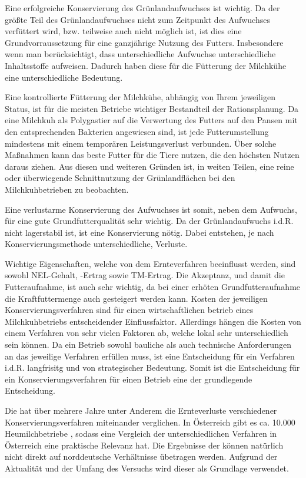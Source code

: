 Eine erfolgreiche Konservierung des Grünlandaufwuchses ist wichtig.
Da der größte Teil des Grünlandaufwuchses nicht zum Zeitpunkt des Aufwuchses verfüttert wird, bzw. teilweise auch nicht möglich ist, ist dies eine Grundvorraussetzung für eine ganzjährige Nutzung des Futters.
Insbesondere wenn man berücksichtigt, dass unterschiedliche Aufwuchse unterschiedliche Inhaltsstoffe aufweisen.
Dadurch haben diese für die Fütterung der Milchkühe eine unterschiedliche Bedeutung.

Eine kontrollierte Fütterung der Milchkühe, abhängig von Ihrem jeweiligen Status, ist für die meisten Betriebe wichtiger Bestandteil der Rationsplanung.
Da eine Milchkuh als Polygastier auf die Verwertung des Futters auf den Pansen mit den entsprechenden Bakterien angewiesen sind, ist jede Futterumstellung mindestens mit einem temporären Leistungsverlust verbunden.
Über solche Maßnahmen kann das beste Futter für die Tiere nutzen, die den höchsten Nutzen daraus ziehen.
Aus diesen und weiteren Gründen ist, in weiten Teilen, eine reine oder überwiegende Schnittnutzung der Grünlandflächen bei den Milchkuhbetrieben zu beobachten.

Eine verlustarme Konservierung des Aufwuchses ist somit, neben dem Aufwuchs, für eine gute Grundfutterqualität sehr wichtig.
Da der Grünlandaufwuchs i.d.R. nicht lagerstabil ist, ist eine Konservierung nötig.
Dabei entstehen, je nach Konservierungsmethode unterschiedliche, Verluste.

Wichtige Eigenschaften, welche von dem Ernteverfahren beeinflusst werden, sind sowohl \ac{NEL}-Gehalt, -Ertrag sowie \ac{TM}-Ertrag.
Die Akzeptanz, und damit die Futteraufnahme, ist auch sehr wichtig, da bei einer erhöten Grundfutteraufnahme die Kraftfuttermenge auch gesteigert werden kann.
Kosten der jeweiligen Konservierungsverfahren sind für einen wirtschaftlichen betrieb eines Milchkuhbetriebs entscheidender Einflussfaktor.
Allerdings hängen die Kosten von einem Verfahren von sehr vielen Faktoren ab, welche lokal sehr unterschiedlich sein können.
Da ein Betrieb sowohl bauliche als auch technische Anforderungen an das jeweilige Verfahren erfüllen muss, ist eine Entscheidung für ein Verfahren i.d.R. langfrisitg und von strategischer Bedeutung.
Somit ist die Entscheidung für ein Konservierungsverfahren für einen Betrieb eine der grundlegende Entscheidung.

Die \HBLFA hat über mehrere Jahre unter Anderem die Ernteverluste verschiedener Konservierungsverfahren miteinander verglichen.
In Österreich gibt es ca. 10.000 Heumilchbetriebe \parencite[75]{fritz2018ansatz}, sodass eine Vergleich der unterschiedlichen Verfahren in Österreich eine praktische Relevanz hat.
Die Ergebnisse der \HBLFA können natürlich nicht direkt auf norddeutsche Verhältnisse übetragen werden.
Aufgrund der Aktualität und der Umfang des Versuchs wird dieser als Grundlage verwendet. 


